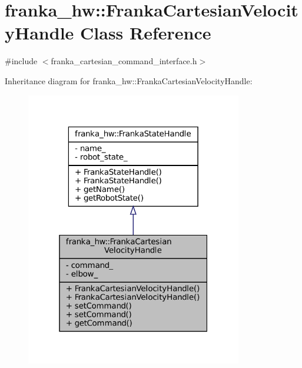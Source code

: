 \hypertarget{classfranka__hw_1_1FrankaCartesianVelocityHandle}{}\section{franka\+\_\+hw\+:\+:Franka\+Cartesian\+Velocity\+Handle Class Reference}
\label{classfranka__hw_1_1FrankaCartesianVelocityHandle}


{\ttfamily \#include $<$franka\+\_\+cartesian\+\_\+command\+\_\+interface.\+h$>$}



Inheritance diagram for franka\+\_\+hw\+:\+:Franka\+Cartesian\+Velocity\+Handle\+:
\nopagebreak
\begin{figure}[H]
\begin{center}
\leavevmode
\includegraphics[width=268pt]{classfranka__hw_1_1FrankaCartesianVelocityHandle__inherit__graph}
\end{center}
\end{figure}


